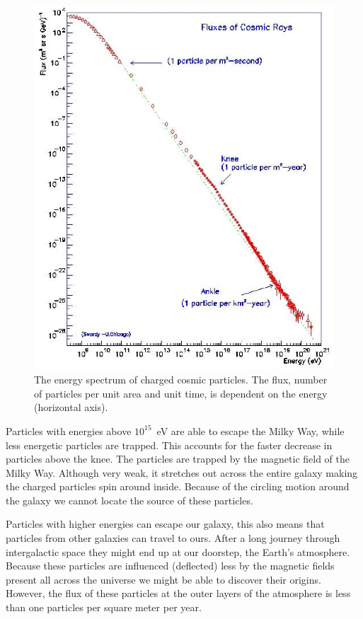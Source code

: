 \documentclass[12pt,a4paper]{article}
\numberwithin{equation}{section}
\numberwithin{figure}{section}
\numberwithin{table}{section}
\begin{document}
\begin{figure}\begin{center}
\includegraphics[scale=0.6]{spectrum.eps}%
\caption{The energy spectrum of charged cosmic particles. The flux, number of particles per unit area and unit time, is dependent on the energy (horizontal axis).}\label{fig:spectrum}
\end{center}\end{figure}

Particles with energies above $10^{15}$~eV are able to escape the Milky Way, while less energetic particles are trapped. This accounts for the faster decrease in particles above the knee. The particles are trapped by the magnetic field of the Milky Way. Although very weak, it stretches out across the entire galaxy making the charged particles spin around inside. Because of the circling motion around the galaxy we cannot locate the source of these particles.

Particles with higher energies can escape our galaxy, this also means that particles from other galaxies can travel to ours. After a long journey through intergalactic space they might end up at our doorstep, the Earth's atmosphere. Because these particles are influenced (deflected) less by the magnetic fields present all across the universe we might be able to discover their origins. However, the flux of these particles at the outer layers of the atmosphere is less than one particles per square meter per year.
\end{document}
